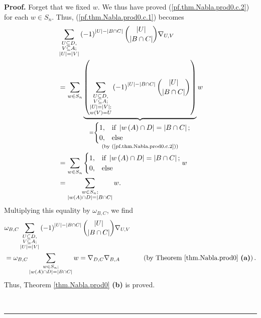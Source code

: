 \documentclass[numbers=enddot,12pt,final,onecolumn,notitlepage]{scrartcl}%
\numberwithin{exer}{subsection}
\theoremstyle{definition}
\newenvironment{proof}[1][Proof]{\noindent\textbf{#1.} }{\ \rule{0.5em}{0.5em}}
\let\sumnonlimits\sum
\renewcommand{\sum}{\sumnonlimits\limits}
\begin{document}
\begin{proof}
Forget that we fixed $w$. We thus have proved (\ref{pf.thm.Nabla.prod0.c.2})
for each $w\in S_{n}$. Thus, (\ref{pf.thm.Nabla.prod0.c.1}) becomes%
\begin{align*}
&  \sum_{\substack{U\subseteq D,\\V\subseteq A;\\\left\vert U\right\vert
=\left\vert V\right\vert }}\left(  -1\right)  ^{\left\vert U\right\vert
-\left\vert B\cap C\right\vert }\dbinom{\left\vert U\right\vert }{\left\vert
B\cap C\right\vert }\nabla_{U,V}\\
&  =\sum_{w\in S_{n}}\underbrace{\left(  \sum_{\substack{U\subseteq
D,\\V\subseteq A;\\\left\vert U\right\vert =\left\vert V\right\vert
;\\w\left(  V\right)  =U}}\left(  -1\right)  ^{\left\vert U\right\vert
-\left\vert B\cap C\right\vert }\dbinom{\left\vert U\right\vert }{\left\vert
B\cap C\right\vert }\right)  }_{\substack{=%
\begin{cases}
1, & \text{if }\left\vert w\left(  A\right)  \cap D\right\vert =\left\vert
B\cap C\right\vert ;\\
0, & \text{else}%
\end{cases}
\\\text{(by (\ref{pf.thm.Nabla.prod0.c.2}))}}}w\\
&  =\sum_{w\in S_{n}}%
\begin{cases}
1, & \text{if }\left\vert w\left(  A\right)  \cap D\right\vert =\left\vert
B\cap C\right\vert ;\\
0, & \text{else}%
\end{cases}
w\\
&  =\sum_{\substack{w\in S_{n};\\\left\vert w\left(  A\right)  \cap
D\right\vert =\left\vert B\cap C\right\vert }}w.
\end{align*}
Multiplying this equality by $\omega_{B,C}$, we find%
\begin{align*}
&  \omega_{B,C}\sum_{\substack{U\subseteq D,\\V\subseteq A;\\\left\vert
U\right\vert =\left\vert V\right\vert }}\left(  -1\right)  ^{\left\vert
U\right\vert -\left\vert B\cap C\right\vert }\dbinom{\left\vert U\right\vert
}{\left\vert B\cap C\right\vert }\nabla_{U,V}\\
&  =\omega_{B,C}\sum_{\substack{w\in S_{n};\\\left\vert w\left(  A\right)
\cap D\right\vert =\left\vert B\cap C\right\vert }}w=\nabla_{D,C}\nabla
_{B,A}\ \ \ \ \ \ \ \ \ \ \left(  \text{by Theorem \ref{thm.Nabla.prod0}
\textbf{(a)}}\right)  .
\end{align*}
Thus, Theorem \ref{thm.Nabla.prod0} \textbf{(b)} is proved. \medskip


\end{proof}
\end{document}
